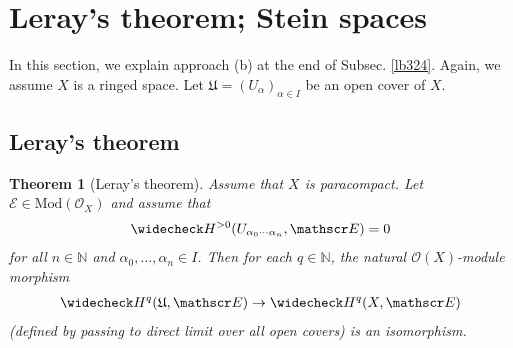 \documentclass[12pt,b5paper,notitlepage]{report}
\theoremstyle{definition}
\theoremstyle{plain}
\newtheorem{thm}[df]{Theorem}
\newcommand{\fk}{\mathfrak}
\newcommand{\wch}{\widecheck}
\newcommand{\scr}{\mathscr}
\newcommand{\Nbb}{\mathbb N}
\newcommand{\Mod}{\mathrm{Mod}}
\numberwithin{equation}{section}
\begin{document}
\section{Leray's theorem; Stein spaces}



In this section, we explain approach (b) at the end of Subsec. \ref{lb324}. Again, we assume $X$ is a ringed space. Let $\fk U=(U_\alpha)_{\alpha\in I}$ be an open cover of $X$.



\subsection{Leray's theorem}


\begin{thm}[Leray's theorem]\label{lb326}   
Assume that $X$ is paracompact. Let $\scr E\in\Mod(\scr O_X)$ and assume that
\begin{align}
\wch H^{>0}(U_{\alpha_0\cdots\alpha_n},\scr E)=0  \label{eq155}
\end{align}
for all $n\in\Nbb$ and $\alpha_0,\dots,\alpha_n\in I$. Then for each $q\in\Nbb$, the natural $\scr O(X)$-module morphism
\begin{align}
\wch H^q(\fk U,\scr E)\rightarrow \wch H^q(X,\scr E)   \label{eq154}
\end{align}
(defined by passing to direct limit over all open covers)  is an isomorphism.
\end{thm}
\end{document}
